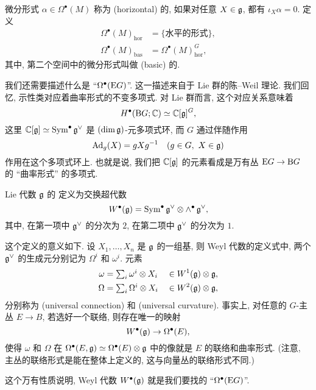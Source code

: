 \begin{definition}
    微分形式 $\alpha \in \Omega^\bullet (M)$ 称为 (horizontal) 的,
    如果对任意 $X \in \mathfrak{g}$, 都有 $\iota_X \alpha = 0$. 定义
    \begin{align*}
        \Omega^\bullet (M)_{\mathrm{hor}} &= \{ \text{水平的形式} \}, \\
        \Omega^\bullet (M)_{\mathrm{bas}} &= \Omega^\bullet (M)_{\mathrm{hor}}^G ,
    \end{align*}
    其中, 第二个空间中的微分形式叫做 (basic) 的.
\end{definition}

我们还需要描述什么是 ``$\Omega^\bullet (\mathrm{E} G)$''.
这一描述来自于 Lie 群的陈--Weil 理论.
我们回忆, 示性类对应着曲率形式的不变多项式. 对 Lie 群而言, 这个对应关系意味着
\[ H^\bullet (\mathrm{B} G; \mathbb{C}) \simeq \mathbb{C} [\mathfrak{g}]^G, \]
这里 $\mathbb{C} [\mathfrak{g}] \simeq \operatorname{Sym}^\bullet \mathfrak{g}^\vee$
是 $(\dim \mathfrak{g})$-元多项式环,
而 $G$ 通过伴随作用
\[ \operatorname{Ad}_g (X) = g X g^{-1} \quad (g \in G, \ X \in \mathfrak{g}) \]
作用在这个多项式环上.
也就是说, 我们把 $\mathbb{C} [\mathfrak{g}]$ 的元素看成是万有丛
$\mathrm{E} G \to \mathrm{B} G$ 的 ``曲率形式'' 的多项式.

\begin{definition}
    Lie 代数 $\mathfrak{g}$ 的 定义为交换超代数
    \[ W^\bullet (\mathfrak{g}) = \operatorname{Sym}^\bullet \mathfrak{g}^\vee
        \otimes {\wedge^\bullet \, \mathfrak{g}^\vee}, \]
    其中, 在第一项中 $\mathfrak{g}^\vee$ 的分次为 $2$,
    在第二项中 $\mathfrak{g}^\vee$ 的分次为 $1$.
\end{definition}

这个定义的意义如下.
设 $X_1, \dotsc, X_n$ 是 $\mathfrak{g}$ 的一组基,
则 Weyl 代数的定义式中,
两个 $\mathfrak{g}^\vee$ 的生成元分别记为 $\Omega^i$ 和 $\omega^i$. 元素
\[ \begin{aligned}
    \omega &= \textstyle \sum_i \omega^i \otimes X_i
        && \in W^1 (\mathfrak{g}) \otimes \mathfrak{g}, \\
    \Omega &= \textstyle \sum_i \Omega^i \otimes X_i
        && \in W^2 (\mathfrak{g}) \otimes \mathfrak{g},
\end{aligned} \]
分别称为 (universal connection)
和 (universal curvature).
事实上, 对任意的 $G$-主丛 $E \to B$, 若选好一个联络,
则存在唯一的映射
\[ W^\bullet (\mathfrak{g}) \to \Omega^\bullet (E), \]
使得 $\omega$ 和 $\Omega$ 在
$\Omega^\bullet (E, \mathfrak{g}) \simeq \Omega^\bullet (E) \otimes \mathfrak{g}$
中的像就是 $E$ 的联络和曲率形式.
(注意, 主丛的联络形式是能在整体上定义的, 这与向量丛的联络形式不同.)

这个万有性质说明, Weyl 代数 $W^\bullet (\mathfrak{g})$
就是我们要找的 ``$\Omega^\bullet (\mathrm{E} G)$''.

